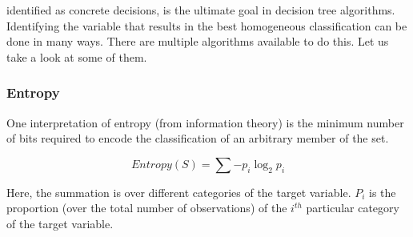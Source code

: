 \documentclass{article}
\numberwithin{equation}{section} %
\begin{document}
identified as concrete decisions, is the ultimate goal in decision tree algorithms.
Identifying the variable that results in the best homogeneous classification can be
done in many ways. There are multiple algorithms available to do this. Let us take a
look at some of them.

\subsubsection*{Entropy}

One interpretation of entropy (from information theory) is the minimum number of bits required to encode the classification of an arbitrary member of the set. 

\begin{equation*}
Entropy(S) = \sum-p_i\log_2p_i
\end{equation*}

Here, the summation is over different categories of the target variable. $P_i$ is the proportion (over the total number of observations) of the $i^{th}$ particular category of the target variable.
\end{document}
